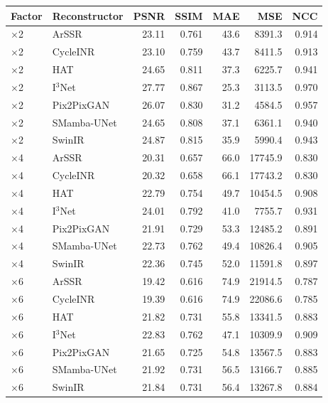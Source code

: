 \begin{tabular}{llrrrrr}
\toprule
Factor & Reconstructor & PSNR & SSIM & MAE & MSE & NCC \\
\midrule
$\times$2 & ArSSR & 23.11 & 0.761 & 43.6 & 8391.3 & 0.914 \\
$\times$2 & CycleINR & 23.10 & 0.759 & 43.7 & 8411.5 & 0.913 \\
$\times$2 & HAT & 24.65 & 0.811 & 37.3 & 6225.7 & 0.941 \\
$\times$2 & I$^3$Net & 27.77 & 0.867 & 25.3 & 3113.5 & 0.970 \\
$\times$2 & Pix2PixGAN & 26.07 & 0.830 & 31.2 & 4584.5 & 0.957 \\
$\times$2 & SMamba-UNet & 24.65 & 0.808 & 37.1 & 6361.1 & 0.940 \\
$\times$2 & SwinIR & 24.87 & 0.815 & 35.9 & 5990.4 & 0.943 \\
\addlinespace[2pt]
$\times$4 & ArSSR & 20.31 & 0.657 & 66.0 & 17745.9 & 0.830 \\
$\times$4 & CycleINR & 20.32 & 0.658 & 66.1 & 17743.2 & 0.830 \\
$\times$4 & HAT & 22.79 & 0.754 & 49.7 & 10454.5 & 0.908 \\
$\times$4 & I$^3$Net & 24.01 & 0.792 & 41.0 & 7755.7 & 0.931 \\
$\times$4 & Pix2PixGAN & 21.91 & 0.729 & 53.3 & 12485.2 & 0.891 \\
$\times$4 & SMamba-UNet & 22.73 & 0.762 & 49.4 & 10826.4 & 0.905 \\
$\times$4 & SwinIR & 22.36 & 0.745 & 52.0 & 11591.8 & 0.897 \\
\addlinespace[2pt]
$\times$6 & ArSSR & 19.42 & 0.616 & 74.9 & 21914.5 & 0.787 \\
$\times$6 & CycleINR & 19.39 & 0.616 & 74.9 & 22086.6 & 0.785 \\
$\times$6 & HAT & 21.82 & 0.731 & 55.8 & 13341.5 & 0.883 \\
$\times$6 & I$^3$Net & 22.83 & 0.762 & 47.1 & 10309.9 & 0.909 \\
$\times$6 & Pix2PixGAN & 21.65 & 0.725 & 54.8 & 13567.5 & 0.883 \\
$\times$6 & SMamba-UNet & 21.92 & 0.731 & 56.5 & 13166.7 & 0.885 \\
$\times$6 & SwinIR & 21.84 & 0.731 & 56.4 & 13267.8 & 0.884 \\
\bottomrule
\end{tabular}
